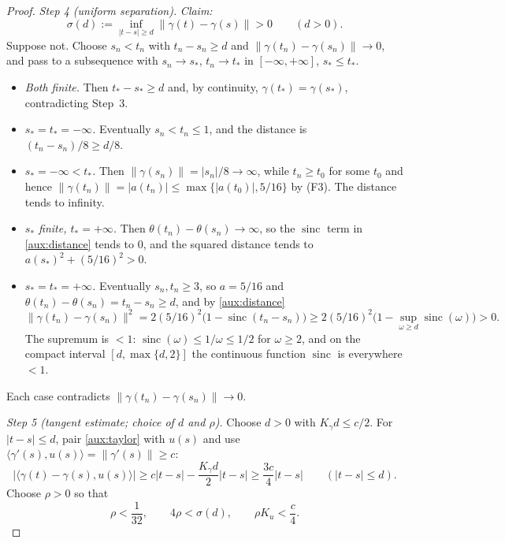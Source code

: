 \documentclass[11pt]{article}
\newcommand{\norm}[1]{\lVert #1\rVert}
\newcommand{\ip}[2]{\langle #1,#2\rangle}
\DeclareMathOperator{\sinc}{sinc}
\theoremstyle{definition}
\numberwithin{equation}{section}
\begin{document}
\begin{proof}
\emph{Step 4 (uniform separation).} \emph{Claim:}
\begin{equation}\label{aux:separation}
 \sigma(d):=\inf_{|t-s|\ge d}\norm{\gamma(t)-\gamma(s)}>0
 \qquad(d>0).
\end{equation}
Suppose not. Choose \(s_n<t_n\) with \(t_n-s_n\ge d\) and
\(\norm{\gamma(t_n)-\gamma(s_n)}\to0\), and pass to a subsequence with
\(s_n\to s_*\), \(t_n\to t_*\) in \([-\infty,+\infty]\), \(s_*\le t_*\).
\begin{itemize}
\item \emph{Both finite.} Then \(t_*-s_*\ge d\) and, by continuity,
\(\gamma(t_*)=\gamma(s_*)\), contradicting Step~3.
\item \emph{\(s_*=t_*=-\infty\).} Eventually \(s_n<t_n\le1\), and the
distance is \((t_n-s_n)/8\ge d/8\).
\item \emph{\(s_*=-\infty<t_*\).} Then
\(\norm{\gamma(s_n)}=|s_n|/8\to\infty\), while \(t_n\ge t_0\) for some
\(t_0\) and hence
\(\norm{\gamma(t_n)}=|a(t_n)|\le\max\{|a(t_0)|,5/16\}\) by (F3). The
distance tends to infinity.
\item \emph{\(s_*\) finite, \(t_*=+\infty\).} Then
\(\theta(t_n)-\theta(s_n)\to\infty\), so the \(\sinc\) term in
\eqref{aux:distance} tends to \(0\), and the squared distance tends to
\(a(s_*)^2+(5/16)^2>0\).
\item \emph{\(s_*=t_*=+\infty\).} Eventually \(s_n,t_n\ge3\), so
\(a=5/16\) and \(\theta(t_n)-\theta(s_n)=t_n-s_n\ge d\), and by
\eqref{aux:distance}
\[
 \norm{\gamma(t_n)-\gamma(s_n)}^2
 =2(5/16)^2\bigl(1-\sinc(t_n-s_n)\bigr)
 \ge2(5/16)^2\bigl(1-\sup_{\omega\ge d}\sinc(\omega)\bigr)>0 .
\]
The supremum is \(<1\): \(\sinc(\omega)\le1/\omega\le1/2\) for
\(\omega\ge2\), and on the compact interval \([d,\max\{d,2\}]\) the
continuous function \(\sinc\) is everywhere \(<1\).
\end{itemize}
Each case contradicts \(\norm{\gamma(t_n)-\gamma(s_n)}\to0\).

\emph{Step 5 (tangent estimate; choice of \(d\) and \(\rho\)).} Choose
\(d>0\) with \(K_\gamma d\le c/2\). For \(|t-s|\le d\), pair
\eqref{aux:taylor} with \(u(s)\) and use
\(\ip{\gamma'(s)}{u(s)}=\norm{\gamma'(s)}\ge c\):
\begin{equation}\label{aux:tangent}
 |\ip{\gamma(t)-\gamma(s)}{u(s)}|
 \ge c|t-s|-\frac{K_\gamma d}{2}|t-s|
 \ge\frac{3c}{4}|t-s|
 \qquad(|t-s|\le d).
\end{equation}
Choose \(\rho>0\) so that
\begin{equation}\label{aux:radius}
 \rho<\frac1{32},\qquad 4\rho<\sigma(d),\qquad \rho K_u<\frac c4.
\end{equation}


\end{proof}
\end{document}
